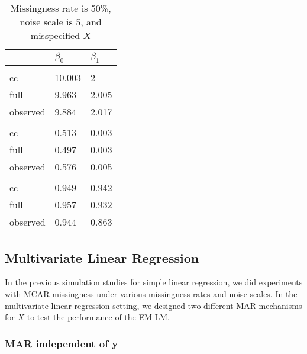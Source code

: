 \documentclass[
  twocolumn]{article}
\begin{document}
\begin{table}[h]
\caption{Missingness rate is 50\%, noise scale is 5, and misspecified $X$}
\begingroup\fontsize{7}{9}\selectfont

\begin{tabu} to 
\toprule
 & $\beta_0$ & $\beta_1$\\
\midrule
\addlinespace[0.3em]
\\
\hspace{1em}cc & 10.003 & 2\\
\hspace{1em}full & 9.963 & 2.005\\
\hspace{1em}observed & 9.884 & 2.017\\
\addlinespace[0.3em]
\\
\hspace{1em}cc & 0.513 & 0.003\\
\hspace{1em}full & 0.497 & 0.003\\
\hspace{1em}observed & 0.576 & 0.005\\
\addlinespace[0.3em]
\\
\hspace{1em}cc & 0.949 & 0.942\\
\hspace{1em}full & 0.957 & 0.932\\
\hspace{1em}observed & 0.944 & 0.863\\
\bottomrule
\end{tabu}
\endgroup{}
\end{table}

\hypertarget{multivariate-linear-regression}{%
\subsection{Multivariate Linear
Regression}\label{multivariate-linear-regression}}

In the previous simulation studies for simple linear regression, we did
experiments with MCAR missingness under various missingness rates and
noise scales. In the multivariate linear regression setting, we designed
two different MAR mechanisms for \(X\) to test the performance of the
EM-LM.

\hypertarget{mar-independent-of-y}{%
\subsubsection{MAR independent of y}\label{mar-independent-of-y}}
\end{document}
